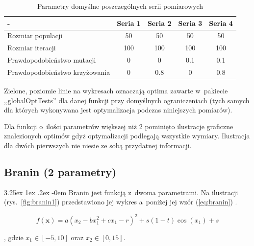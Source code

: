 \documentclass[11pt, a4paper]{article}
\makeatletter
\newcommand{\fbi}{\leavevmode{\parindent=1em\indent}}
\renewcommand\paragraph{\@startsection{paragraph}{5}{\z@}
  {3.25ex \@plus1ex \@minus.2ex}
  {-0em}
  {\normalfont\normalsize\bfseries}}
\makeatother
\begin{document}
\begin{table}[H]
	\centering
	\caption{Parametry domyślne poszczególnych serii pomiarowych}
	\label{tab:parametry}
	\begin{tabularx}{\textwidth}{|X|c|c|c|c|}
		\hline
		- & Seria 1 & Seria 2 & Seria 3 & Seria 4\\ 
		\hline
		Rozmiar populacji & 50 & 50 & 50 & 50 \\ 
		\hline 
		Rozmiar iteracji & 100 & 100 & 100 & 100 \\ 
		\hline 
		Prawdopodobieństwo mutacji & 0 & 0 & 0.1 & 0.1 \\ 
		\hline 
		Prawdopodobieństwo krzyżowania & 0 & 0.8 & 0 & 0.8 \\ 
		\hline 
	\end{tabularx} 
\end{table}

\fbi
Zielone, poziomie linie na wykresach oznaczają optima zawarte w~pakiecie ,,globalOptTests'' dla danej funkcji przy domyślnych ograniczeniach (tych samych dla których wykonywana jest optymalizacja podczas niniejszych pomiarów).

\fbi
Dla funkcji o~ilości parametrów większej niż 2 pominięto ilustracje graficzne znalezionych optimów gdyż optymalizacji podlegają wszystkie wymiary. Ilustracja dla dwóch pierwszych nie niesie ze sobą przydatnej informacji.

\newpage
\subsection{Branin (2 parametry)}
\paragraph{}
Branin jest funkcją z~dwoma parametrami. Na ilustracji (rys.~\ref{fig:branin1}) przedstawiono jej wykres a~poniżej jej wzór (\ref{eq:branin}) \cite{test4}.

\begin{equation}\label{eq:branin}
	f(\boldsymbol{x}) = a(x_2 - bx_1^2 + cx_1 - r)^2 + s(1 - t)\cos(x_1) + s
\end{equation}

, gdzie $ x_1 \in [-5, 10] $ oraz $ x_2 \in [0, 15] $.
\end{document}
